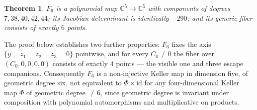 \documentclass[11pt]{article}
\theoremstyle{plain}
\newtheorem{theorem}{Theorem}[section]
\theoremstyle{definition}
\theoremstyle{remark}
\newcommand{\C}{\mathbb{C}}
\begin{document}
\begin{theorem}\label{thm:F6}
$F_6$ is a polynomial map $\C^5\to\C^5$ with components of degrees
$7,38,40,42,44$; its Jacobian determinant is identically $-290$; and its
generic fiber consists of exactly $6$ points.
\end{theorem}

The proof below establishes two further properties: $F_6$ fixes the axis
$\{y=z_1=z_2=z_3=0\}$ pointwise, and for every $C_0\neq0$ the fiber over
$(C_0,0,0,0,0)$ consists of exactly $4$ points --- the visible one and three
escape companions. Consequently $F_6$ is a non-injective Keller map in
dimension five, of geometric degree six, not equivalent to
$\Phi\times\mathrm{id}$ for any four-dimensional Keller map $\Phi$ of geometric
degree $\neq6$, since geometric degree is invariant under composition with
polynomial automorphisms and multiplicative on products.
\end{document}
